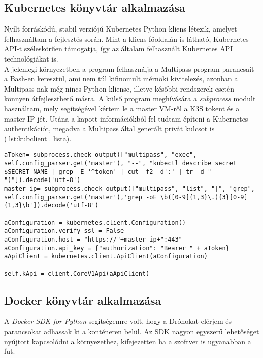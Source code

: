 \subsection{Kubernetes könyvtár alkalmazása}
Nyílt forráskódú, stabil verziójú Kubernetes Python kliens létezik, amelyet felhasználtam a fejlesztés során. \cite{kubpy} Mint a kliens főoldalán is látható, Kubernetes API-t széleskörűen támogatja, így az általam felhasznált Kubernetes API technológiákat is. \\

\noindent
A jelenlegi környezetben a program felhasználja a Multipass program parancsait a Bash-en keresztül, ami nem túl kifinomult mérnöki kivitelezés, azonban a Multipass-nak még nincs Python kliense, illetve későbbi rendszerek esetén könnyen átfejleszthető másra. A külső program meghívására a \emph{subprocess} modult használtam, mely segítségével kértem le a master VM-ről a K3S tokent és a master IP-jét. Utána a kapott információkból fel tudtam építeni a Kubernetes authentikációt, megadva a Multipass által generált privát kulcsot is (\ref{lst:kubclient}. lista).

\begin{lstlisting}[caption={Kubernetes kliens felépítése}, label={lst:kubclient}]
aToken= subprocess.check_output(["multipass", "exec", self.config_parser.get('master'), "--", "kubectl describe secret $SECRET_NAME | grep -E '^token' | cut -f2 -d':' | tr -d " ")"]).decode('utf-8')
master_ip= subprocess.check_output(["multipass", "list", "|", "grep", self.config_parser.get('master'),'grep -oE \b([0-9]{1,3}\.){3}[0-9]{1,3}\b']).decode('utf-8')

aConfiguration = kubernetes.client.Configuration()
aConfiguration.verify_ssl = False
aConfiguration.host = "https://"+master_ip+":443"
aConfiguration.api_key = {"authorization": "Bearer " + aToken}
aApiClient = kubernetes.client.ApiClient(aConfiguration)

self.kApi = client.CoreV1Api(aApiClient)
\end{lstlisting}

\subsection{Docker könyvtár alkalmazása}
A \emph{Docker SDK for Python} segítségemre volt, hogy a Drónokat elérjem és parancsokat adhassak ki a konténeren belül. Az SDK nagyon egyszerű lehetőséget nyújtott kapcsolódni a környezethez, kifejezetten ha a szoftver is ugyanabban a fut. \\

